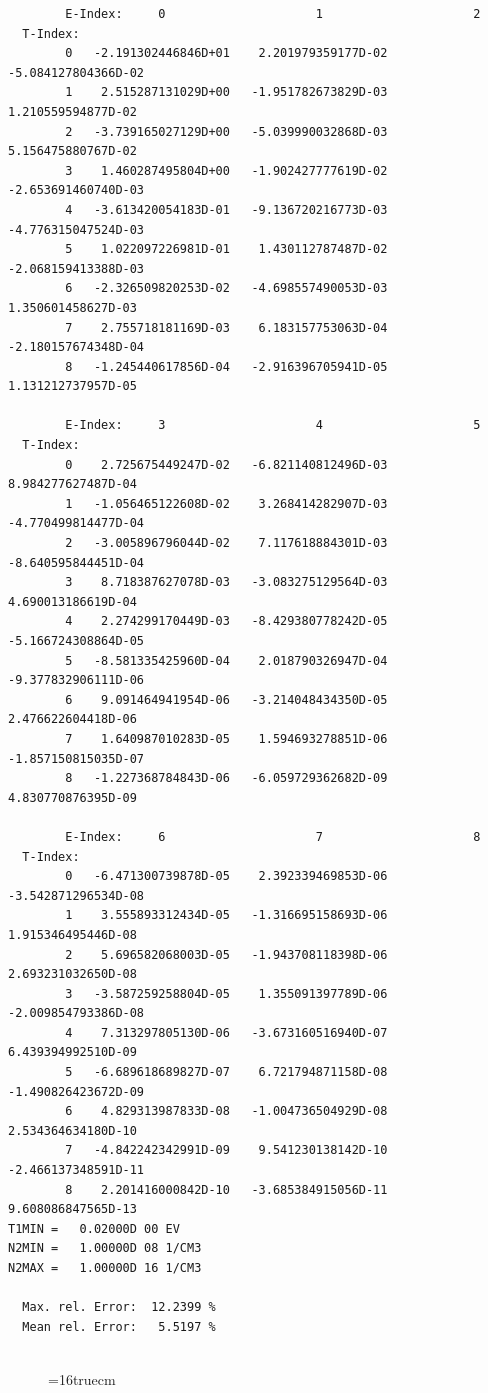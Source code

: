 \documentclass[12pt,dvipdfmx]{article}
\begin{document}
\begin{small}\begin{verbatim}
        E-Index:     0                     1                     2
  T-Index:
        0   -2.191302446846D+01    2.201979359177D-02   -5.084127804366D-02
        1    2.515287131029D+00   -1.951782673829D-03    1.210559594877D-02
        2   -3.739165027129D+00   -5.039990032868D-03    5.156475880767D-02
        3    1.460287495804D+00   -1.902427777619D-02   -2.653691460740D-03
        4   -3.613420054183D-01   -9.136720216773D-03   -4.776315047524D-03
        5    1.022097226981D-01    1.430112787487D-02   -2.068159413388D-03
        6   -2.326509820253D-02   -4.698557490053D-03    1.350601458627D-03
        7    2.755718181169D-03    6.183157753063D-04   -2.180157674348D-04
        8   -1.245440617856D-04   -2.916396705941D-05    1.131212737957D-05

        E-Index:     3                     4                     5
  T-Index:
        0    2.725675449247D-02   -6.821140812496D-03    8.984277627487D-04
        1   -1.056465122608D-02    3.268414282907D-03   -4.770499814477D-04
        2   -3.005896796044D-02    7.117618884301D-03   -8.640595844451D-04
        3    8.718387627078D-03   -3.083275129564D-03    4.690013186619D-04
        4    2.274299170449D-03   -8.429380778242D-05   -5.166724308864D-05
        5   -8.581335425960D-04    2.018790326947D-04   -9.377832906111D-06
        6    9.091464941954D-06   -3.214048434350D-05    2.476622604418D-06
        7    1.640987010283D-05    1.594693278851D-06   -1.857150815035D-07
        8   -1.227368784843D-06   -6.059729362682D-09    4.830770876395D-09

        E-Index:     6                     7                     8
  T-Index:
        0   -6.471300739878D-05    2.392339469853D-06   -3.542871296534D-08
        1    3.555893312434D-05   -1.316695158693D-06    1.915346495446D-08
        2    5.696582068003D-05   -1.943708118398D-06    2.693231032650D-08
        3   -3.587259258804D-05    1.355091397789D-06   -2.009854793386D-08
        4    7.313297805130D-06   -3.673160516940D-07    6.439394992510D-09
        5   -6.689618689827D-07    6.721794871158D-08   -1.490826423672D-09
        6    4.829313987833D-08   -1.004736504929D-08    2.534364634180D-10
        7   -4.842242342991D-09    9.541230138142D-10   -2.466137348591D-11
        8    2.201416000842D-10   -3.685384915056D-11    9.608086847565D-13
T1MIN =   0.02000D 00 EV
N2MIN =   1.00000D 08 1/CM3
N2MAX =   1.00000D 16 1/CM3

  Max. rel. Error:  12.2399 %
  Mean rel. Error:   5.5197 %


\end{verbatim}\end{small}
\begin{figure} \label{3.2.3mar}
\epsfxsize=16truecm
\end{figure}
\newpage
\end{document}
